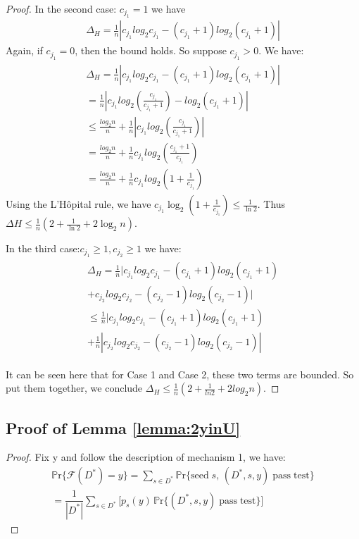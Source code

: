\begin{proof}
	 
	 In the second case: $ c_ {j_1} = 1 $ we have
	 \begin{eqnarray}
	 \Delta_H = \frac{1}{n}|c_{j_1}log_2 {c_{j_1}}  - (c_{j_1}+1) log_2 (c_{j_1}+1)|
	 \end{eqnarray}
	 Again, if $ c_{j_1} = 0 $, then the bound holds. So suppose $ c_ {j_1}> 0 $. We have:
	 \begin{eqnarray}
	 \begin{aligned}	
	 \Delta_H = \frac{1}{n}|c_{j_1}log_2 {c_{j_1}} - (c_{j_1}+1) log_2 (c_{j_1}+1)| \\
	 =  \frac{1}{n} |c_{j_1}log_2(\frac{c_{j_1}}{c_{j_1}+1}) - log_2(c_{j_1}+1)| \\
	 \leq \frac{log_2 n }{n} + \frac{1}{n}| c_{j_1} log_2 (\frac{c_{j_1}}{c_{j_1}+1})| \\
	 = \frac{log_2 n }{n}  + \frac{1}{n} c_{j_1} log_2 (\frac{c_{j_1}+1}{c_{j_1}}) \\
	  = \frac{log_2 n }{n}  + \frac{1}{n} c_{j_1} log_2 (1+ \frac{1}{c_{j_1}}) 
	 \end{aligned}
	 \end{eqnarray}
	 Using the L'H\^{o}pital rule, we have $c_{j_1} \log_2(1 + \frac{1}{c_{j_1}}) \leq \frac{1}{\ln 2}$. Thus $\Delta H \leq \frac{1}{n}(2+ \frac{1}{\ln 2} + 2\log_2 n)$.
	 
	 
	 In the third case:$c_{j_1} \geq 1 ,c_{j_2} \geq 1 $ we have:
	 	 \begin{eqnarray}
	 \begin{aligned}	
	 \Delta_H = \frac{1}{n}|c_{j_1}log_2 {c_{j_1}} - (c_{j_1}+1) log_2 (c_{j_1}+1) \\ + c_{j_2} log_2 c_{j_2} - (c_{j_2}-1)log_2 (c_{j_2} -1 ) | \\
	 \leq \frac{1}{n}|c_{j_1}log_2 {c_{j_1}} - (c_{j_1}+1) log_2 (c_{j_1}+1) \\
	 + \frac{1}{n}| c_{j_2}log_2 c_{j_2} - (c_{j_2} -1)log_2(c_{j_2}-1)|
	 \end{aligned}
	 \end{eqnarray}
	 
	 It can be seen here that for Case 1 and Case 2, these two terms are bounded. So put them together, we conclude $\Delta_H \leq \frac{1}{n} (2+ \frac{1}{ln 2} + 2 log_2 n)$.
\end{proof}



\subsection{Proof of Lemma \ref{lemma:2yinU}}
\begin{proof}

Fix y and follow the description of mechanism 1, we have:
\begin{equation}
\begin{aligned}
\mathbb{P}\mathrm{r}\{\mathcal{F}(D^*)=y\} = \sum_{s \in D^*} \mathbb{P}\mathrm{r}\{\mathrm{seed}\;s,\, (D^*,s,y)\;\mathrm{pass\;test}\} \\
=\dfrac{1}{|D^*|} \sum_{s\in D^*} \bigl[p_s(y)\,\mathbb{P}\mathrm{r}\{(D^*,s,y)\;\mathrm{pass\;test}\}\bigr]
\end{aligned}
\end{equation}
\end{proof}



